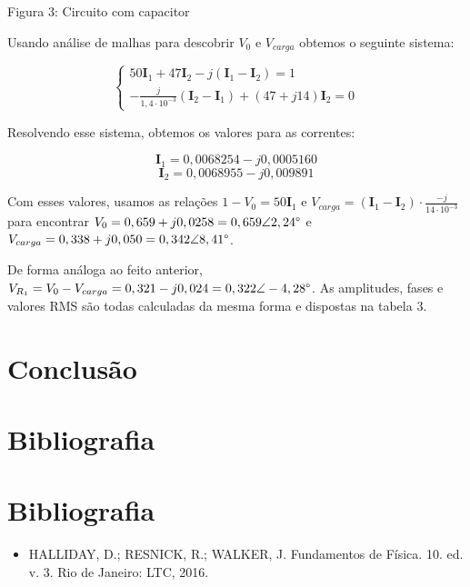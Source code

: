 \documentclass[a4 paper]{article}
\begin{document}
\begin{center}
Figura 3: Circuito com capacitor 
\end{center}

Usando análise de malhas para descobrir $V_0$ e $V_{carga}$ obtemos o seguinte sistema:

\begin{equation*}
\left\{
\begin{aligned}
50\textbf{I}_1+47\textbf{I}_2-j(\textbf{I}_1-\textbf{I}_2)=1\\
-\frac{j}{1,4\cdot10^{-3}}(\textbf{I}_2-\textbf{I}_1)+(47+j14)\textbf{I}_2=0
\end{aligned}\right.
\end{equation*}

Resolvendo esse sistema, obtemos os valores para as correntes:

\[\textbf{I}_1=0,0068254-j0,0005160\]
\[\textbf{I}_2=0,0068955-j0,009891\]


Com esses valores, usamos as relações $1-V_0=50\textbf{I}_1$ e $V_{carga}=(\textbf{I}_1-\textbf{I}_2)\cdot\frac{-j}{14\cdot10^{-3}}$ para encontrar $V_0=0,659+j0,0258=0,659\angle2,24\text{\textdegree}$ e $V_{carga}=0,338+j0,050=0,342\angle8,41\text{\textdegree}$.

De forma análoga ao feito anterior, $V_{R_1}=V_0-V_{carga}=0,321-j0,024=0,322\angle-4,28\text{\textdegree}$. As amplitudes, fases e valores RMS são todas calculadas da mesma forma e dispostas na tabela 3.



\section{Conclusão}

\section{Bibliografia}

\section{Bibliografia}

\begin{itemize}
\item HALLIDAY, D.; RESNICK, R.; WALKER, J. Fundamentos de Física. 10. ed. v. 3. Rio de Janeiro: LTC, 2016.
\end{itemize}
\end{document}
